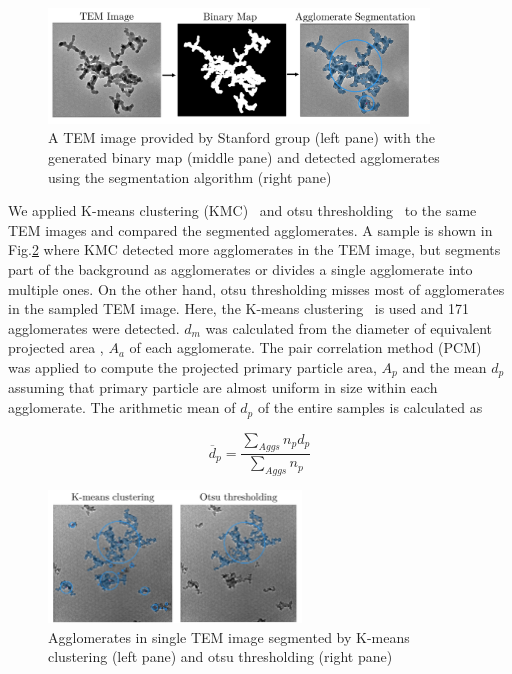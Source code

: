 \begin{figure}[H]
	\centering
	\includegraphics[width=0.9\textwidth]{Figures/Results/Shocktube/Stanford/TEM/binarymapprocess.pdf}
	\caption{A TEM image provided by Stanford group (left pane) with the generated binary map (middle pane) and detected agglomerates using the segmentation algorithm (right pane)}
	\label{fig:shocktubest_binarymapprocess} 
\end{figure}

We applied K-means clustering (KMC)~\citep{sipkens2021using} and otsu thresholding~\citep{dastanpour2016automated} to the same TEM images and compared the segmented agglomerates. A sample is shown in Fig.\ref{fig:shocktubest_aggseg_compare} where KMC detected more agglomerates in the TEM image, but segments part of the background as agglomerates or divides a single agglomerate into multiple ones. On the other hand, otsu thresholding misses most of agglomerates in the sampled TEM image. Here, the K-means clustering~\citep{sipkens2021using} is used and 171 agglomerates were detected. $d_m$ was calculated from the diameter of equivalent projected area , $A_a$ of each agglomerate. The pair correlation method (PCM)~\citep{dastanpour2016automated} was applied to compute the projected primary particle area, $A_p$ and the mean $d_p$ assuming that primary particle are almost uniform in size within each agglomerate. The arithmetic mean of $d_p$ of the entire samples is calculated as 

\begin{equation}
	\overline{d}_{p} = \frac{\sum_{Aggs} n_p d_p}{\sum_{Aggs} n_p} 
	\label{eqn:meandp}
\end{equation}


\begin{figure}[H]
	\centering
	\includegraphics[width=0.6\textwidth]{Figures/Results/Shocktube/Stanford/TEM/aggseg_compare.pdf}
	\caption{Agglomerates in single TEM image segmented by K-means clustering (left pane) and otsu thresholding (right pane)}
	\label{fig:shocktubest_aggseg_compare} 
\end{figure}


